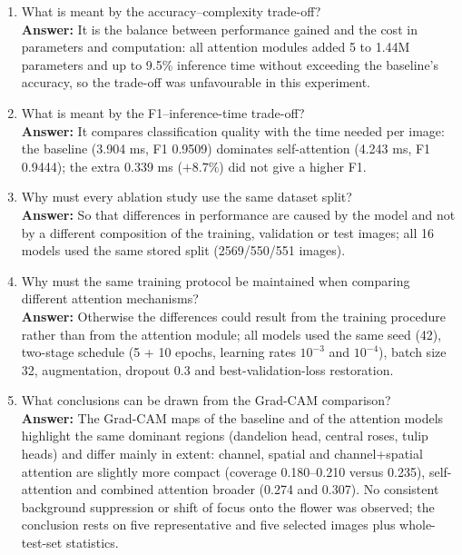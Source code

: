 \documentclass[10pt]{article}
\begin{document}
\begin{enumerate}
\item What is meant by the accuracy--complexity trade-off?\\
\textbf{Answer:} It is the balance between performance gained and the cost in parameters and computation: all attention modules added 5 to 1.44M parameters and up to 9.5\% inference time without exceeding the baseline's accuracy, so the trade-off was unfavourable in this experiment.

\item What is meant by the F1--inference-time trade-off?\\
\textbf{Answer:} It compares classification quality with the time needed per image: the baseline (3.904 ms, F1 0.9509) dominates self-attention (4.243 ms, F1 0.9444); the extra 0.339 ms ($+8.7\%$) did not give a higher F1.

\item Why must every ablation study use the same dataset split?\\
\textbf{Answer:} So that differences in performance are caused by the model and not by a different composition of the training, validation or test images; all 16 models used the same stored split (2569/550/551 images).

\item Why must the same training protocol be maintained when comparing
different attention mechanisms?\\
\textbf{Answer:} Otherwise the differences could result from the training procedure rather than from the attention module; all models used the same seed (42), two-stage schedule (5 + 10 epochs, learning rates $10^{-3}$ and $10^{-4}$), batch size 32, augmentation, dropout 0.3 and best-validation-loss restoration.

\item What conclusions can be drawn from the Grad-CAM comparison?\\
\textbf{Answer:} The Grad-CAM maps of the baseline and of the attention models highlight the same dominant regions (dandelion head, central roses, tulip heads) and differ mainly in extent: channel, spatial and channel+spatial attention are slightly more compact (coverage 0.180--0.210 versus 0.235), self-attention and combined attention broader (0.274 and 0.307). No consistent background suppression or shift of focus onto the flower was observed; the conclusion rests on five representative and five selected images plus whole-test-set statistics.

\end{enumerate}
\end{document}
